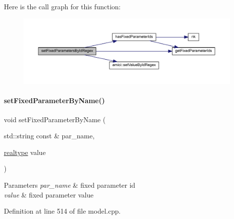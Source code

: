 Here is the call graph for this function\+:
\nopagebreak
\begin{figure}[H]
\begin{center}
\leavevmode
\includegraphics[width=350pt]{classamici_1_1_model_acda9b9debfd3d6ac77e2d27a48bfb5d6_cgraph}
\end{center}
\end{figure}
\mbox{\label{classamici_1_1_model_af1225439bd6deceb98b224e75a960800}} 
\paragraph{\texorpdfstring{set\+Fixed\+Parameter\+By\+Name()}{setFixedParameterByName()}}
{\footnotesize\ttfamily void set\+Fixed\+Parameter\+By\+Name (\begin{DoxyParamCaption}\item[{std\+::string const \&}]{par\+\_\+name,  }\item[{\mbox{\hyperlink{namespaceamici_a1bdce28051d6a53868f7ccbf5f2c14a3}{realtype}}}]{value }\end{DoxyParamCaption})}


\begin{DoxyParams}{Parameters}
{\em par\+\_\+name} & fixed parameter id \\
\hline
{\em value} & fixed parameter value \\
\hline
\end{DoxyParams}


Definition at line 514 of file model.\+cpp.

